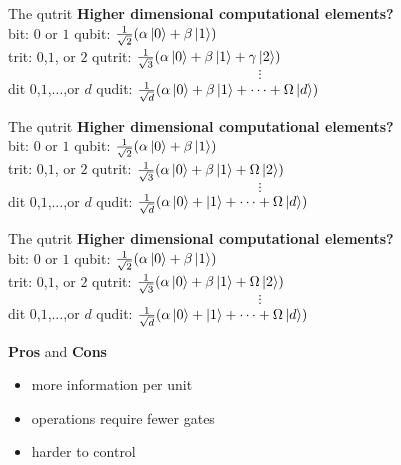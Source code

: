 \documentclass[t]{beamer}
\begin{document}
\begin{frame}{The qutrit}
\textbf{Higher dimensional computational elements?}
\\
bit: $0$ or $1$ \hspace{4cm} qubit: $\frac{1}{\sqrt{2}}(\alpha\ket{0} + \beta\ket{1})$
\\
trit: $0$,$1$, or $2$ \hspace{3.5cm} qutrit: $\frac{1}{\sqrt{3}}(\alpha\ket{0} + \beta\ket{1} + \gamma\ket{2})$
\\
$$\mathbf{\vdots} $$
dit $0$,$1$,$\dots$,or $d$ \hspace{3cm} qudit: $\frac{1}{\sqrt{d}}(\alpha\ket{0} + \beta\ket{1} + \dots + \Omega\ket{d})$
\end{frame}

\begin{frame}{The qutrit}
\textbf{Higher dimensional computational elements?}
\\
bit: $0$ or $1$ \hspace{4cm} qubit: $\frac{1}{\sqrt{2}}(\alpha\ket{0} + \beta\ket{1})$
\\
trit: $0$,$1$, or $2$ \hspace{3.5cm} qutrit: $\frac{1}{\sqrt{3}}(\alpha\ket{0} + \beta\ket{1} + \Omega\ket{2})$
\\
$$\mathbf{\vdots} $$
dit $0$,$1$,$\dots$,or $d$ \hspace{3cm} qudit: $\frac{1}{\sqrt{d}}(\alpha\ket{0} + \ket{1} + \dots + \Omega\ket{d})$

\end{frame}


\begin{frame}{The qutrit}
\textbf{Higher dimensional computational elements?}
\\
bit: $0$ or $1$ \hspace{4cm} qubit: $\frac{1}{\sqrt{2}}(\alpha\ket{0} + \beta\ket{1})$
\\
trit: $0$,$1$, or $2$ \hspace{3.5cm} qutrit: $\frac{1}{\sqrt{3}}(\alpha\ket{0} + \beta\ket{1} + \Omega\ket{2})$
\\
$$\mathbf{\vdots} $$
dit $0$,$1$,$\dots$,or $d$ \hspace{3cm} qudit: $\frac{1}{\sqrt{d}}(\alpha\ket{0} + \ket{1} + \dots + \Omega\ket{d})$


\textbf{Pros} and \textbf{Cons}
\begin{itemize}
\item more information per unit
\item operations require fewer gates 
\item harder to control
\end{itemize}
\end{frame}
\end{document}
